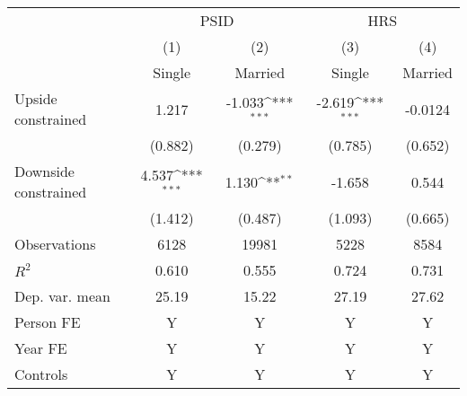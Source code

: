 {
\def\sym#1{\ifmmode^{#1}\else\(^{#1}\)\fi}
\begin{tabular}{l*{4}{c}}
\toprule
                    &\multicolumn{2}{c}{PSID}                   &\multicolumn{2}{c}{HRS}                    \\\cmidrule(lr){2-3}\cmidrule(lr){4-5}
                    &\multicolumn{1}{c}{(1)}&\multicolumn{1}{c}{(2)}&\multicolumn{1}{c}{(3)}&\multicolumn{1}{c}{(4)}\\
                    &\multicolumn{1}{c}{Single}&\multicolumn{1}{c}{Married}&\multicolumn{1}{c}{Single}&\multicolumn{1}{c}{Married}\\
\midrule
Upside constrained  &       1.217         &      -1.033\sym{***}&      -2.619\sym{***}&     -0.0124         \\
                    &     (0.882)         &     (0.279)         &     (0.785)         &     (0.652)         \\
\addlinespace
Downside constrained&       4.537\sym{***}&       1.130\sym{**} &      -1.658         &       0.544         \\
                    &     (1.412)         &     (0.487)         &     (1.093)         &     (0.665)         \\
\midrule
Observations        &        6128         &       19981         &        5228         &        8584         \\
\(R^{2}\)           &       0.610         &       0.555         &       0.724         &       0.731         \\
Dep. var. mean      &       25.19         &       15.22         &       27.19         &       27.62         \\
Person FE           &           Y         &           Y         &           Y         &           Y         \\
Year FE             &           Y         &           Y         &           Y         &           Y         \\
Controls            &           Y         &           Y         &           Y         &           Y         \\
\bottomrule
\end{tabular}
}
